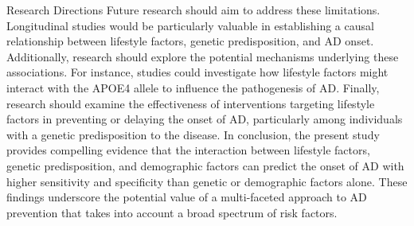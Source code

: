 \documentclass[conference]{IEEEtran}
\begin{document}
Research Directions Future research should aim to address these limitations. Longitudinal studies would be particularly valuable in establishing a causal relationship between lifestyle factors, genetic predisposition, and AD onset. Additionally, research should explore the potential mechanisms underlying these associations. For instance, studies could investigate how lifestyle factors might interact with the APOE4 allele to influence the pathogenesis of AD. Finally, research should examine the effectiveness of interventions targeting lifestyle factors in preventing or delaying the onset of AD, particularly among individuals with a genetic predisposition to the disease. In conclusion, the present study provides compelling evidence that the interaction between lifestyle factors, genetic predisposition, and demographic factors can predict the onset of AD with higher sensitivity and specificity than genetic or demographic factors alone. These findings underscore the potential value of a multi-faceted approach to AD prevention that takes into account a broad spectrum of risk factors.
\end{document}
